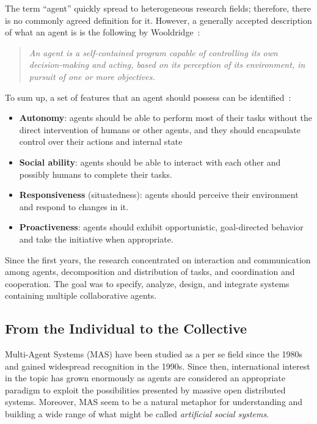 The term ``agent'' quickly spread to heterogeneous research fields; therefore, there is no commonly agreed definition for it.
However, a generally accepted description of what an agent is is the following by Wooldridge~\cite{490039}:
\begin{quote}
    \textit{An agent is a self-contained program capable of controlling its own decision-making and acting, based on its perception of its environment, in pursuit of one or more objectives.}
\end{quote}
To sum up, a set of features that an agent should possess can be identified~\cite{490039}:
\begin{itemize}
    \item \textbf{Autonomy}: agents should be able to perform most of their tasks without the direct intervention of humans or other agents, and they should encapsulate control over their actions and internal state
    \item \textbf{Social ability}: agents should be able to interact with each other and possibly humans to complete their tasks.
    \item \textbf{Responsiveness} (situatedness): agents should perceive their environment and respond to changes in it.
    \item \textbf{Proactiveness}: agents should exhibit opportunistic, goal-directed behavior and take the initiative when appropriate.
\end{itemize}

Since the first years, the research concentrated on interaction and communication among agents, decomposition and distribution of tasks, and coordination and cooperation.
The goal was to specify, analyze, design, and integrate systems containing multiple collaborative agents.

\subsection{From the Individual to the Collective}
Multi-Agent Systems (MAS) have been studied as a per se field since the 1980s and gained widespread recognition in the 1990s.
Since then, international interest in the topic has grown enormously as agents are considered an appropriate paradigm to exploit the possibilities presented by massive open distributed systems.
Moreover, MAS seem to be a natural metaphor for understanding and building a wide range of what might be called \textit{artificial social systems}.~\cite{wooldridge2009introduction}

